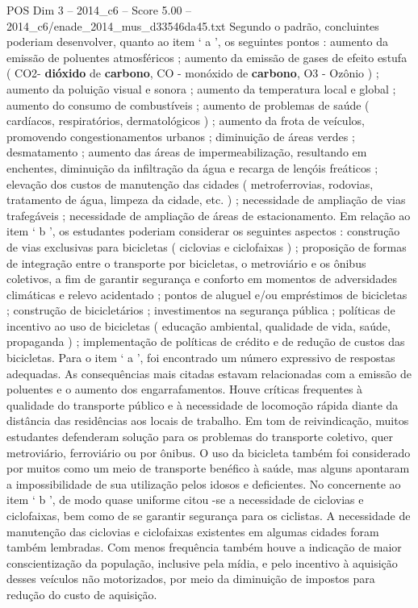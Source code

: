 \begin{textsample}{POS Dim 3 – 2014\_c6 – Score 5.00 – 2014\_c6/enade\_2014\_mus\_d33546da45.txt}
Segundo o padrão, concluintes poderiam desenvolver, quanto ao item ‘ a ’, os seguintes pontos : aumento da emissão de poluentes atmosféricos ; aumento da emissão de gases de efeito estufa ( CO2- \textbf{dióxido} de \textbf{carbono}, CO - monóxido de \textbf{carbono}, O3 - Ozônio ) ; aumento da poluição visual e sonora ; aumento da temperatura local e global ; aumento do consumo de combustíveis ; aumento de problemas de saúde ( cardíacos, respiratórios, dermatológicos ) ; aumento da frota de veículos, promovendo congestionamentos urbanos ; diminuição de áreas verdes ; desmatamento ; aumento das áreas de impermeabilização, resultando em enchentes, diminuição da infiltração da água e recarga de lençóis freáticos ; elevação dos custos de manutenção das cidades ( metroferrovias, rodovias, tratamento de água, limpeza da cidade, etc. ) ; necessidade de ampliação de vias trafegáveis ; necessidade de ampliação de áreas de estacionamento.
Em relação ao item ‘ b ’, os estudantes poderiam considerar os seguintes aspectos : construção de vias exclusivas para bicicletas ( ciclovias e ciclofaixas ) ; proposição de formas de integração entre o transporte por bicicletas, o metroviário e os ônibus coletivos, a fim de garantir segurança e conforto em momentos de adversidades climáticas e relevo acidentado ; pontos de aluguel e/ou empréstimos de bicicletas ; construção de bicicletários ; investimentos na segurança pública ; políticas de incentivo ao uso de bicicletas ( educação ambiental, qualidade de vida, saúde, propaganda ) ; implementação de políticas de crédito e de redução de custos das bicicletas.
Para o item ‘ a ’, foi encontrado um número expressivo de respostas adequadas.
As consequências mais citadas estavam relacionadas com a emissão de poluentes e o aumento dos engarrafamentos.
Houve críticas frequentes à qualidade do transporte público e à necessidade de locomoção rápida diante da distância das residências aos locais de trabalho.
Em tom de reivindicação, muitos estudantes defenderam solução para os problemas do transporte coletivo, quer metroviário, ferroviário ou por ônibus.
O uso da bicicleta também foi considerado por muitos como um meio de transporte benéfico à saúde, mas alguns apontaram a impossibilidade de sua utilização pelos idosos e deficientes.
No concernente ao item ‘ b ’, de modo quase uniforme citou -se a necessidade de ciclovias e ciclofaixas, bem como de se garantir segurança para os ciclistas.
A necessidade de manutenção das ciclovias e ciclofaixas existentes em algumas cidades foram também lembradas.
Com menos frequência também houve a indicação de maior conscientização da população, inclusive pela mídia, e pelo incentivo à aquisição desses veículos não motorizados, por meio da diminuição de impostos para redução do custo de aquisição.

\end{textsample}
